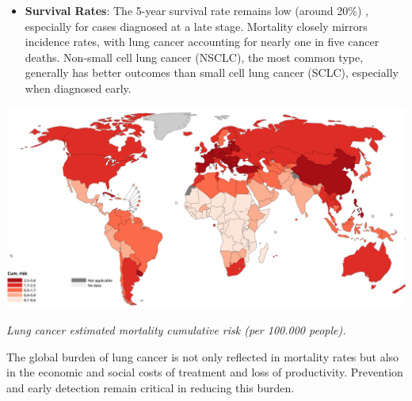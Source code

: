 \begin{itemize}
    \item \textbf{Survival Rates}: The 5-year survival rate remains low (around 20\%) 
    \cite{nlm2025}, especially for cases diagnosed at a late stage. Mortality closely mirrors 
    incidence rates, with lung cancer accounting for nearly one in five cancer deaths. Non-small 
    cell lung cancer (NSCLC), the most common type, generally has better outcomes than small cell 
    lung cancer (SCLC), especially when diagnosed early.
\end{itemize}

\vspace{1em}
\begin{center}
    \includegraphics[width=1.00\textwidth]{../assets/01-overview/lc-cumulative-risk.png}

    \small\textit{Lung cancer estimated mortality cumulative risk (per 100.000 people). 
    \cite{who2024}}
\end{center}
\vspace{1em}

The global burden of lung cancer is not only reflected in mortality rates but also in the economic 
and social costs of treatment and loss of productivity. Prevention and early detection remain 
critical in reducing this burden.
